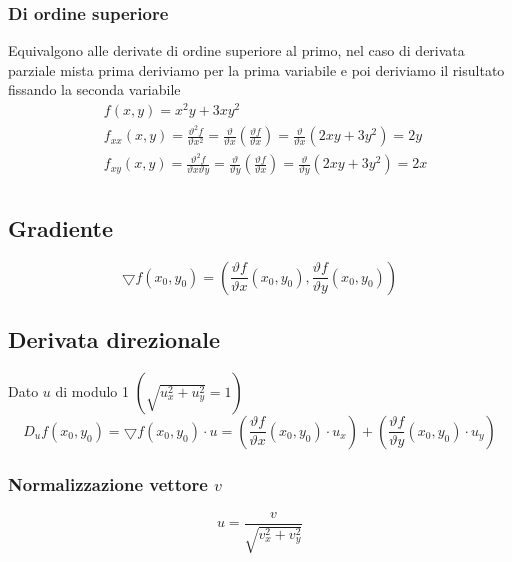 \documentclass[10pt, a4paper]{article}
\begin{document}
    \subsubsection{Di ordine superiore}
        Equivalgono alle derivate di ordine superiore al primo, nel caso di derivata parziale mista prima deriviamo per la prima variabile e poi deriviamo il risultato fissando la seconda variabile
        \begin{equation*}
            \begin{split}
                &f(x,y)=x^2y+3xy^2 \\
                & f_{xx}(x,y)=\frac{\vartheta^2 f}{\vartheta x^2}=\frac{\vartheta}{\vartheta x}\left(\frac{\vartheta f}{\vartheta x}\right)=\frac{\vartheta}{\vartheta x}(2xy+3y^2)=2y\\
                & f_{xy}(x,y)=\frac{\vartheta^2 f}{\vartheta x\vartheta y}=\frac{\vartheta}{\vartheta y}\left(\frac{\vartheta f}{\vartheta x}\right)=\frac{\vartheta}{\vartheta y}(2xy+3y^2)=2x\\
            \end{split}
        \end{equation*}
    \subsection{Gradiente}
        \begin{equation*}
            \bigtriangledown f(x_0,y_0) = \left(\frac{\vartheta f}{\vartheta x}(x_0,y_0),\frac{\vartheta f}{\vartheta y}(x_0,y_0)\right)
        \end{equation*}
    \subsection{Derivata direzionale}
        Dato $u$ di modulo 1 $\left(\sqrt{u_x^2+u_y^2}=1\right)$
        \begin{equation*}
            D_uf(x_0,y_0)=\bigtriangledown f(x_0,y_0)\cdot u = \left(\frac{\vartheta f}{\vartheta x}(x_0,y_0)\cdot u_x\right) + \left(\frac{\vartheta f}{\vartheta y}(x_0,y_0)\cdot u_y\right)
        \end{equation*}
    \subsubsection{Normalizzazione vettore $v$}
        \begin{equation*}
            u=\frac{v}{\sqrt{v_x^2+v_y^2}}
        \end{equation*}
\end{document}
